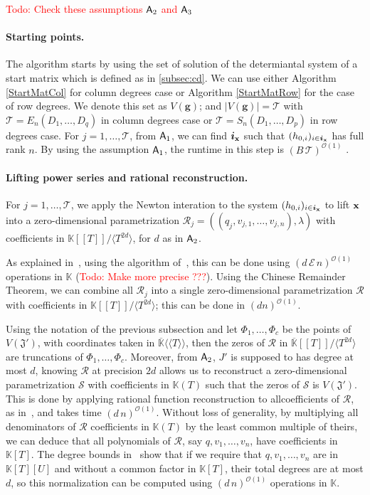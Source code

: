 \documentclass[11pt]{article}
\numberwithin{Property}{section}
\numberwithin{Theorem}{section}
\numberwithin{Proposition}{section}
\numberwithin{Lemma}{section}
\numberwithin{Corollary}{section}
\numberwithin{Definition}{section}
\numberwithin{Remark}{section}
\numberwithin{Conjecture}{section}
\numberwithin{Problem}{section}
\numberwithin{Claim}{section}
\theoremstyle{definition}
\numberwithin{Example}{section}
\def\g {\ensuremath{\mathbf{g}}}
\def\bar{\overline}
\newcommand{\bigO}[1]{\mathcal{O}(#1)} %
\newcommand{\field}{\mathbb{K}} %
\newcommand{\todo}[1]{\textcolor{red}{#1}} %
\newcommand{\improve}[1]{\textcolor{blue}{#1}} %
\begin{document}
\todo{Todo: Check these assumptions ${\sf A}_2$ and ${\sf A}_3$}
\paragraph{Starting points.} The algorithm starts by using the set of solution of the determiantal system of a start matrix which is defined as in \improve{\cref{subsec:cd}}. We can use either Algorithm \ref{StartMatCol} for column degrees case or Algorithm \ref{StartMatRow} for the case of row degrees. We denote this set as $V(\g)$; and $|V(\g)| = \mathcal{T}$ with $\mathcal{T} = E_{n}(D_1, \ldots, D_q)$ in column degrees case  or $\mathcal{T} = S_{n}(D_1, \ldots, D_p)$ in row degrees case. For $j  =1, \ldots, \mathcal{T}$, from ${\sf A}_1 $, we can find ${\bm i}_{\bf x}$ such that $(h_{0,i})_{i \in {\bm i}_{\bf x}}$ has full rank $n$. By using the assumption ${\sf A}_1$, the runtime in this step is $(B \,\mathcal{T})^{\bigO{1}}$ . 

\paragraph{Lifting power series and rational reconstruction.} For $j  =1, \ldots, \mathcal{T}$, we apply the Newton interation to the system $(h_{0,i})_{i \in {\bm i}_{\bf x}}$ to lift ${\bf x}$ into a zero-dimensional parametrization $\mathscr{R}_j = ((q_j,v_{j,1}, \ldots, v_{j,n}), \lambda)$ with coefficients in $\field[[T]]/\langle T^{2d}\rangle$, for $d$ as in ${\sf A}_2$. 

As explained in~\cite[Section~2.2]{SaSc16}, using the algorithm of~\cite{GiLeSa01}, this can be done using $(d\,\mathcal{E}\,n)^{\bigO{1}}$ operations in $\field$ (\todo{Todo: Make more precise ???}). Using the Chinese Remainder Theorem, we can combine all $\mathscr{R}_j$ into a single zero-dimensional parametrization $\mathscr{R}$ with coefficients in $\field[[T]]/\langle T^{2d}\rangle$; this can be done in $(dn)^{\bigO{1}}$. 

Using the notation of the previous subsection and let $\Phi_1,\dots,\Phi_{c}$ be the points of $V(\mathfrak{J}')$, with coordinates taken in $\bar{\field}\langle\langle T \rangle\rangle$, then the zeros of $\mathscr{R}$ in $\bar{\field}[[T]]/\langle T^{2d} \rangle$ are truncations of $\Phi_1,\dots,\Phi_{c}$. Moreover, from ${\sf A}_2$, $J'$ is supposed to has degree at most $d$, knowing $\mathscr{R}$  at precision $2d$ allows us to reconstruct a zero-dimensional parametrization $\mathscr{S}$ with coefficients in $\field(T)$ such that the zeros of $\mathscr{S}$ is $V(\mathfrak{J}')$. This is done by applying rational function reconstruction to allcoefficients of $\mathscr{R}$, as in~\cite{Schost03}, and takes time $(d\,n)^{\bigO{1}}$. Without loss of generality, by multiplying all denominators of $\mathscr{R}$ coefficients in $\field(T)$ by the least common multiple of theirs, we can deduce that all polynomials of $\mathscr{R}$, say $q, v_1, \ldots, v_n$, have coefficients in $\field[T]$. The degree bounds in~\cite{Schost03} show that
if we require that $q, v_1, \ldots, v_n$ are in $\field[T][U]$ and without a common factor in $\field[T]$,
their total degrees are at most $d$, so this normalization can be
computed using $(d\,n)^{\bigO{1}}$ operations in $\field$. 
\end{document}
